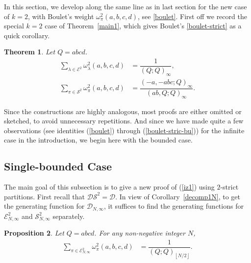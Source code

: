 \documentclass[12pt]{amsart}
\numberwithin{equation}{section}
\theoremstyle{plain}
\newtheorem{theorem}{Theorem}[section]
\newtheorem{proposition}[theorem]{Proposition}
\theoremstyle{definition}
\begin{document}
In this section, we develop along the same line as in last section for the new case of $k=2$, with Boulet's weight $\omega^2_\pi(a,b,c,d)$, see \eqref{boulet}. First off we record the special $k=2$ case of Theorem~\ref{main1}, which gives Boulet's \eqref{boulet-strict} as a quick corollary.
\begin{theorem}\label{gf2strict} Let $Q=abcd$.
\begin{align}
\label{gfE2}\sum\limits_{\lambda\in \mathcal{E}^2}\omega^2_{\lambda}(a,b,c,d) &=\dfrac{1}{(Q;Q)_{\infty}},\\
\label{gf2id}
\sum\limits_{\pi\in\mathcal{S}^2}\omega^2_{\pi}(a,b,c,d)&=\dfrac{(-a,-abc;Q)_{\infty}}{(ab,Q;Q)_{\infty}}.
\end{align}
\end{theorem}

Since the constructions are highly analogous, most proofs are either omitted or 
sketched, to avoid unnecessary repetitions. And since we have made quite a few observations 
(see identities (\ref{boulet}) through (\ref{boulet-stric-bu})) for the infinite case in the introduction, we begin here with the bounded case. 

\subsection{Single-bounded Case}\label{BC1}
The main goal of this subsection is to give a new proof of (\ref{iz1}) using $2$-strict partitions. First recall that $\mathcal{DS}^2=\mathcal{D}$. In view of Corollary~\ref{decomp1N}, to get the generating function for $\mathcal{D}_{N,\infty}$, it suffices to find the generating functions for $\mathcal{E}^2_{N,\infty}$ and $\mathcal{S}^2_{N,\infty}$ separately.

\begin{proposition} Let $Q=abcd$.
For any non-negative integer $N$,
\begin{align}
\label{gfE2b}\sum\limits_{\pi\in \mathcal{E}^2_{N,\infty}}\omega^2_{\pi}(a,b,c,d) &=\dfrac{1}{(Q;Q)_{\left\lfloor{N}/{2}\right\rfloor}}.
\end{align}
\end{proposition}
\end{document}
